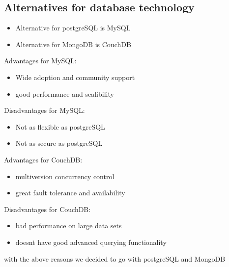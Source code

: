 \documentclass[12pt]{article}
\begin{document}
\subsection{Alternatives for database technology}
\begin{itemize}
    \item Alternative for postgreSQL is MySQL
    \item Alternative for MongoDB is CouchDB
\end{itemize}
Advantages for MySQL:
\begin{itemize}
    \item Wide adoption and community support
    \item good performance and scalibility
\end{itemize}
Disadvantages for MySQL:
\begin{itemize}
    \item Not as flexible as postgreSQL
    \item Not as secure as postgreSQL
\end{itemize}
Advantages for CouchDB:
\begin{itemize}
    \item multiversion concurrency control
    \item great fault tolerance and availability
\end{itemize}
Disadvantages for CouchDB:
\begin{itemize}
    \item bad performance on large data sets
    \item doesnt have good advanced querying functionality
\end{itemize}
with the above reasons we decided to go with postgreSQL and MongoDB
\end{document}
